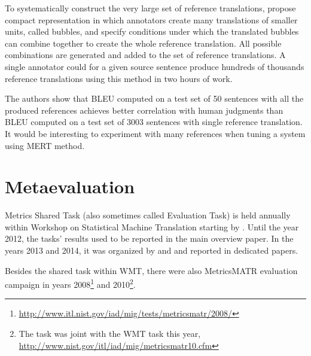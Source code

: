 To systematically construct the very large set of reference translations,
 propose compact representation in which
annotators create many translations of smaller units, called bubbles, and
specify conditions under which the translated bubbles can combine together to
create the whole reference translation. All possible combinations are generated
and added to the set of reference translations. A single annotator could for a
given source sentence produce hundreds of thousands reference translations
using this method in two hours of work. 

The authors show that BLEU computed on a test set of 50 sentences with all the
produced references achieves better correlation with human judgments than BLEU
computed on a test set of 3003 sentences with single reference translation. It
would be interesting to experiment with many references when tuning a system
using MERT method.

\section{Metaevaluation}

Metrics Shared Task (also sometimes called Evaluation Task) is held annually
within Workshop on Statistical Machine Translation starting by
. Until the year 2012, the tasks' results used to be reported
in the main overview paper.  In the years 2013 and 2014, it was organized by
 and  and reported in dedicated
papers. 

Besides the shared task within WMT, there were also MetricsMATR evaluation
campaign in years
2008\footnote{\url{http://www.itl.nist.gov/iad/mig/tests/metricsmatr/2008/}}
and
2010\footnote{The task was joint with the WMT task this year, \url{http://www.nist.gov/itl/iad/mig/metricsmatr10.cfm}}.

